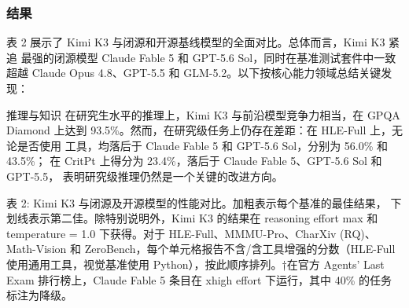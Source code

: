 \subsubsection{结果}\label{results}

表 2 展示了 Kimi K3 与闭源和开源基线模型的全面对比。总体而言，Kimi K3 紧追
最强的闭源模型 Claude Fable 5 和 GPT-5.6 Sol，同时在基准测试套件中一致
超越 Claude Opus 4.8、GPT-5.5 和 GLM-5.2。以下按核心能力领域总结关键发现：

推理与知识 在研究生水平的推理上，Kimi K3 与前沿模型竞争力相当，在 GPQA Diamond
上达到 93.5\%。然而，在研究级任务上仍存在差距：在 HLE-Full 上，无论是否使用
工具，均落后于 Claude Fable 5 和 GPT-5.6 Sol，分别为 56.0\% 和 43.5\%；
在 CritPt 上得分为 23.4\%，落后于 Claude Fable 5、GPT-5.6 Sol 和 GPT-5.5，
表明研究级推理仍然是一个关键的改进方向。

表 2: Kimi K3 与闭源及开源模型的性能对比。加粗表示每个基准的最佳结果，
下划线表示第二佳。除特别说明外，Kimi K3 的结果在 reasoning effort max
和 temperature = 1.0 下获得。对于 HLE-Full、MMMU-Pro、CharXiv (RQ)、
Math-Vision 和 ZeroBench，每个单元格报告不含/含工具增强的分数（HLE-Full
使用通用工具，视觉基准使用 Python），按此顺序排列。†在官方 Agents' Last Exam
排行榜上，Claude Fable 5 条目在 xhigh effort 下运行，其中 40\% 的任务标注为降级。

